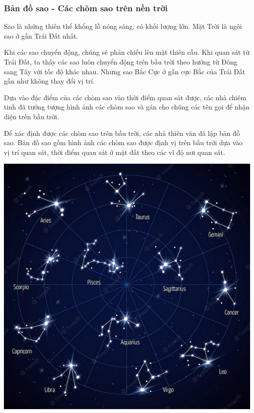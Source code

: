 \subsubsection{Bản đồ sao - Các chòm sao trên nền trời}
Sao là những thiên thể khổng lồ nóng sáng, có khối lượng lớn. Mặt Trời là ngôi sao ở gần Trái Đất nhất.

\begin{minipage}[l]{0.6\textwidth}
	
	Khi các sao chuyển động, chúng sẽ phản chiếu lên mặt thiên cầu. Khi quan sát từ Trái Đất, ta thấy các sao luôn chuyển động trên bầu trời theo hướng từ Đông sang Tây với tốc độ khác nhau. Nhưng sao Bắc Cực ở gần cực Bắc của Trái Đất gần như không thay đổi vị trí.
	
	Dựa vào đặc điểm của các chòm sao vào thời điểm quan sát được, các nhà chiêm tinh đã tưởng tượng hình ảnh các chòm sao và gán cho chúng các tên gọi để nhận diện trên bầu trời.
	
	Để xác định được các chòm sao trên bầu trời, các nhà thiên văn đã lập bản đồ sao. Bản đồ sao gồm hình ảnh các chòm sao được định vị trên bầu trời dựa vào vị trí quan sát, thời điểm quan sát ở mặt đất theo các vĩ độ nơi quan sát.
	
\end{minipage}
\begin{minipage}[r]{0.4\textwidth}
	\begin{center}
		\includegraphics[scale=0.5]{../figs/G10-033-2.png}
	\end{center}
\end{minipage}

